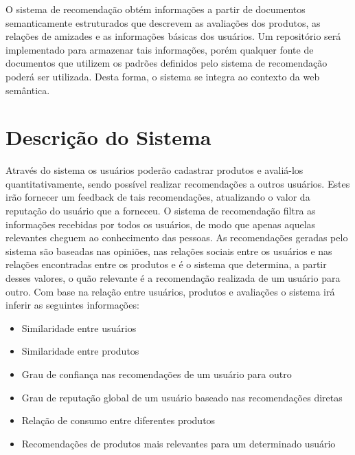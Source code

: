 
 O sistema de recomendação obtém informações a partir de documentos semanticamente estruturados que descrevem as avaliações dos produtos, as relações de amizades e as informações básicas dos usuários. Um repositório será implementado para armazenar tais informações, porém qualquer fonte de documentos que utilizem os padrões definidos pelo sistema de recomendação poderá ser utilizada. Desta forma, o sistema se integra ao contexto da web semântica.



\section{Descrição do Sistema}


 Através do sistema os usuários poderão cadastrar produtos e avaliá-los quantitativamente, sendo possível realizar recomendações a outros usuários. Estes irão fornecer um feedback de tais recomendações, atualizando o valor da reputação do usuário que a forneceu. O sistema de recomendação filtra as informações recebidas por todos os usuários, de modo que apenas aquelas relevantes cheguem ao conhecimento das pessoas. As recomendações geradas pelo sistema são baseadas nas opiniões, nas relações sociais entre os usuários e nas relações encontradas entre os produtos e é o sistema que determina, a partir desses valores, o quão relevante é a recomendação realizada de um usuário para outro. Com base na relação entre usuários, produtos e avaliações o sistema irá inferir as seguintes informações:
 
\begin{itemize}

 \item Similaridade entre usuários

 \item Similaridade entre produtos

 \item Grau de confiança nas recomendações de um usuário para outro

 \item Grau de reputação global de um usuário baseado nas recomendações diretas

 \item Relação de consumo entre diferentes produtos

 \item Recomendações de produtos mais relevantes para um determinado usuário

\end{itemize}

